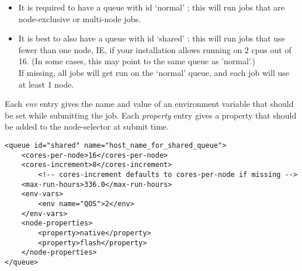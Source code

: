 \begin{itemize}
	\item It is required to have a queue with id `normal' ; this will run jobs that are node-exclusive or multi-node jobs.
	\item It is best to also have a queue with id `shared' ; this will run jobs that use fewer than one node, IE, if your installation allows running on 2 cpus out of 16. (In some cases, this may point to the same queue as 'normal'.) \\ If missing, all jobs will get run on the `normal' queue, and each job will use at least 1 node.
\end{itemize}

Each {\it env } entry gives the name and value of an environment variable that should be set while submitting the job.
Each {\it property } entry gives a property that should be added to the node-selector at submit time.

\begin{lstlisting}[caption={Example Queue entry}]
<queue id="shared" name="host_name_for_shared_queue">
	<cores-per-node>16</cores-per-node>
	<cores-increment>8</cores-increment>
		<!-- cores-increment defaults to cores-per-node if missing -->
	<max-run-hours>336.0</max-run-hours>
	<env-vars>
		<env name="QOS">2</env>
	</env-vars>
	<node-properties>
		<property>native</property>
		<property>flash</property>
	</node-properties>
</queue>
\end{lstlisting}